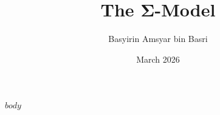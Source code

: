 \documentclass[11pt,a4paper]{article}
\title{The Σ-Model}
\author{Basyirin Amsyar bin Basri}
\date{March 2026}
\begin{document}
\maketitle

$body$



\end{document}
